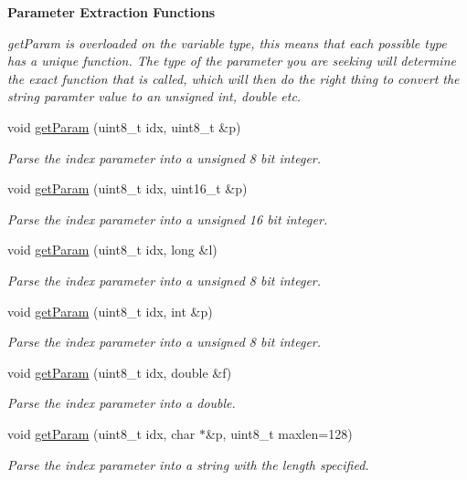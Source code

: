 \begin{Indent}{\bf Parameter Extraction Functions}\par
{\em getParam is overloaded on the variable type, this means that each possible type has a unique function. The type of the parameter you are seeking will determine the exact function that is called, which will then do the right thing to convert the string paramter value to an unsigned int, double etc. }\begin{DoxyCompactItemize}
\item 
void \hyperlink{class_cmd_processor_a904eb6afbd77b68ec05d9c9043d4e0de}{getParam} (uint8\_\-t idx, uint8\_\-t \&p)
\begin{DoxyCompactList}\small\item\em Parse the index parameter into a unsigned 8 bit integer. \item\end{DoxyCompactList}\item 
void \hyperlink{class_cmd_processor_a6ecb6c34b183926aeb224b660eb03b73}{getParam} (uint8\_\-t idx, uint16\_\-t \&p)
\begin{DoxyCompactList}\small\item\em Parse the index parameter into a unsigned 16 bit integer. \item\end{DoxyCompactList}\item 
void \hyperlink{class_cmd_processor_abb99f82aa0e9c1c7023c334745e5b92d}{getParam} (uint8\_\-t idx, long \&l)
\begin{DoxyCompactList}\small\item\em Parse the index parameter into a unsigned 8 bit integer. \item\end{DoxyCompactList}\item 
void \hyperlink{class_cmd_processor_a8cac703be39a93f638732e67b361fea0}{getParam} (uint8\_\-t idx, int \&p)
\begin{DoxyCompactList}\small\item\em Parse the index parameter into a unsigned 8 bit integer. \item\end{DoxyCompactList}\item 
void \hyperlink{class_cmd_processor_aa0a295be3ce1557d86c5cc98394c3da1}{getParam} (uint8\_\-t idx, double \&f)
\begin{DoxyCompactList}\small\item\em Parse the index parameter into a double. \item\end{DoxyCompactList}\item 
void \hyperlink{class_cmd_processor_a3d0f2ffbbf0400d21c957da7c92109d5}{getParam} (uint8\_\-t idx, char $\ast$\&p, uint8\_\-t maxlen=128)
\begin{DoxyCompactList}\small\item\em Parse the index parameter into a string with the length specified. \item\end{DoxyCompactList}\end{DoxyCompactItemize}
\end{Indent}
